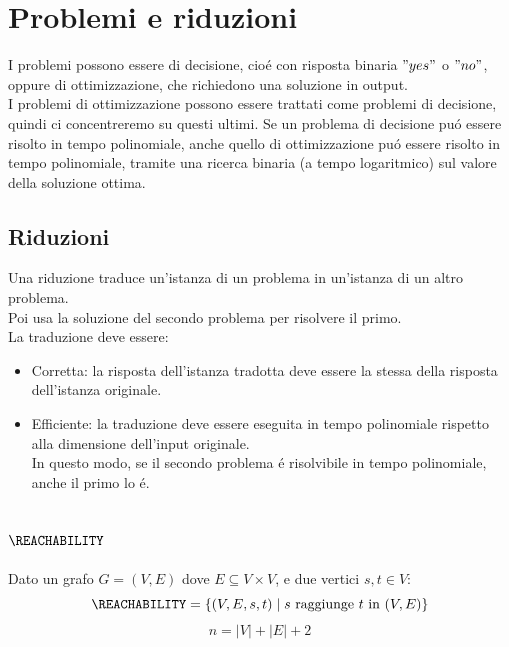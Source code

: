 
\section{Problemi e riduzioni}
I problemi possono essere di decisione, cioé con risposta binaria $"yes"$ o $"no"$, 
oppure di ottimizzazione, che richiedono una soluzione in output. \\

I problemi di ottimizzazione possono essere trattati come problemi di decisione, quindi
ci concentreremo su questi ultimi. Se un problema di decisione puó essere risolto in tempo polinomiale,
anche quello di ottimizzazione puó essere risolto in tempo polinomiale, tramite una ricerca binaria (a tempo logaritmico)
sul valore della soluzione ottima.

\subsection{Riduzioni}
Una riduzione traduce un'istanza di un problema in un'istanza di un altro problema. \\
Poi usa la soluzione del secondo problema per risolvere il primo. \\
La traduzione deve essere:
\begin{itemize}
    \item Corretta: la risposta dell'istanza tradotta deve essere la stessa della risposta dell'istanza originale.
    \item Efficiente: la traduzione deve essere eseguita in tempo polinomiale rispetto alla dimensione dell'input originale. \\
    In questo modo, se il secondo problema é risolvibile in tempo polinomiale, anche il primo lo é.
\end{itemize}


\subsection{$\REACHABILITY$}
\label{problema:reachability}
Dato un grafo $G = (V, E)$ dove $E \subseteq V \times V$, e due vertici $s, t \in V$:
\[
\REACHABILITY = \{ (V, E, s, t) \mid s \text{ raggiunge } t \text{ in } (V, E) \} 
\]
\[
n = |V| + |E| + 2
\]

